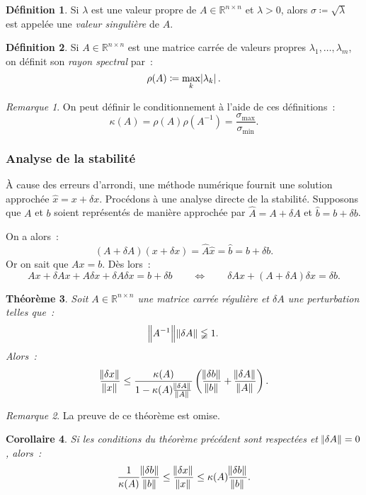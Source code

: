 \documentclass{article}
\newtheorem{thm}{Théorème}[section]
\newtheorem{cor}[thm]{Corollaire}
\theoremstyle{definition}
\newtheorem{déf}[thm]{Définition}
\theoremstyle{remark}
\newtheorem*{rmq}{Remarque}
\newcommand{\R}{\mathbb R}
\begin{document}
		\begin{déf} Si $\lambda$ est une valeur propre de $A \in \R^{n \times n}$ et $\lambda > 0$, alors $\sigma \coloneqq \sqrt \lambda$ est appelée une
		\emph{valeur singulière} de $A$.
		\end{déf}

		\begin{déf} Si $A \in \R^{n \times n}$ est une matrice carrée de valeurs propres $\lambda_1, \dotsc, \lambda_m$, on définit son \emph{rayon spectral}
		par~:
		\[\rho(A) \coloneqq \max_k\abs{\lambda_k}.\]
		\end{déf}

		\begin{rmq} On peut définir le conditionnement à l'aide de ces définitions~:
		\[\kappa(A) = \rho(A)\rho(A^{-1}) = \frac {\sigma_{\text{max}}}{\sigma_{\text{min}}}.\]
		\end{rmq}

		\subsubsection{Analyse de la stabilité}
		À cause des erreurs d'arrondi, une méthode numérique fournit une solution approchée $\widehat x = x + \delta x$. Procédons à une analyse directe de
		la stabilité. Supposons que $A$ et $b$ soient représentés de manière approchée par $\widehat A = A + \delta A$ et $\widehat b = b + \delta b$.

		On a alors~:
		\[(A + \delta A)(x + \delta x) = \widehat A\widehat x = \widehat b = b + \delta b.\]
		Or on sait que $Ax = b$. Dès lors~:
		\[Ax + \delta Ax + A\delta x + \delta A\delta x = b + \delta b \qquad\iff\qquad \delta A x + (A+\delta A)\delta x = \delta b.\]

		\begin{thm} Soit $A \in \R^{n \times n}$ une matrice carrée régulière et $\delta A$ une perturbation telles que~:
		\[\norm {A^{-1}}\norm {\delta A} \lneqq 1.\]
		Alors~:
		\[\frac {\norm{\delta x}}{\norm x}
		\leq \frac {\kappa(A)}{1 - \kappa(A)\frac {\norm {\delta A}}{\norm A}}\left(\frac {\norm{\delta b}}{\norm b} + \frac {\norm{\delta A}}{\norm A}\right).\]
		\end{thm}

		\begin{rmq} La preuve de ce théorème est omise. \end{rmq}

		\begin{cor} Si les conditions du théorème précédent sont respectées et $\norm {\delta A} = 0$, alors~:
		\[\frac 1{\kappa(A)}\frac {\norm {\delta b}}{\norm b} \leq \frac {\norm {\delta x}}{\norm x} \leq \kappa(A)\frac {\norm {\delta b}}{\norm b}.\]
		\end{cor}
\end{document}
